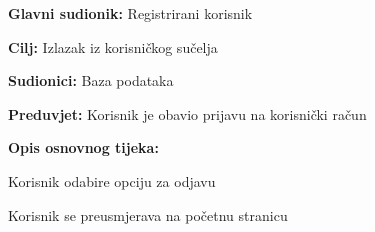 \noindent {}
\begin{packed_item}

	\item \textbf{Glavni sudionik: }Registrirani korisnik
	\item  \textbf{Cilj:} Izlazak iz korisničkog sučelja
	\item  \textbf{Sudionici:} Baza podataka
	\item  \textbf{Preduvjet:} Korisnik je obavio prijavu na korisnički račun
	\item  \textbf{Opis osnovnog tijeka:}

	\item[] \begin{packed_enum}

		\item Korisnik odabire opciju za odjavu
		\item Korisnik se preusmjerava na početnu stranicu
	\end{packed_enum}
\end{packed_item}

